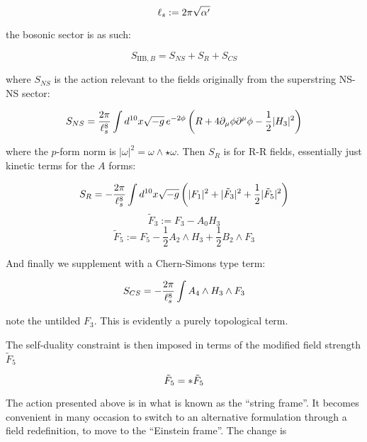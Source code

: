 \begin{equation}
	\ell_s := 2\pi \sqrt{\alpha'}
	\label{}
\end{equation}

the bosonic sector is as such:

\begin{equation} S_{\text{IIB},B} = S_{NS} + S_R + S_{CS} \label{iibsugraS}\end{equation}

where $S_{NS}$ is the action relevant to the fields originally from the superstring NS-NS sector:

\begin{equation}
S_{NS} = \frac{2\pi}{\ell_s^8} \int d^{10} x \sqrt{-g} \, e^{-2\phi} \left( R + 4 \partial_\mu \phi \partial^\mu \phi - \frac{1}{2} | H_3 |^2 \right) 
\end{equation}

where the $p$-form norm is $|\omega|^2 = \omega \wedge \star \omega$. Then $S_R$ is for R-R fields, essentially just kinetic terms for the $A$ forms:

\begin{equation}
	S_R = -\frac{2\pi}{\ell_s^8} \int d^{10} x \sqrt{-g} 
\left(| F_1 |^2 + | \tilde{F}_3 |^2 + \frac{1}{2}| \tilde{F}_5 |^2 \right)
\end{equation}
\begin{equation}
	\tilde{F}_3 := F_3 - A_0 H_3
\end{equation}
\begin{equation}
	\tilde{F}_5 := F_5 - \frac{1}{2} A_2 \wedge H_3 + \frac{1}{2} B_2 \wedge F_3
\end{equation}

And finally we supplement with a Chern-Simons type term:

\begin{equation}
S_{CS} = -\frac{2\pi}{\ell_s^8} \int A_4 \wedge H_3 \wedge F_3 
\end{equation}

note the untilded $F_3$. This is evidently a purely topological term.

The self-duality constraint is then imposed in terms of the modified field strength $\tilde F_5$

\begin{equation}
	\tilde F_5 = \ast \tilde F_5
	\label{}
\end{equation}

The action presented above is in what is known as the ``string frame''. It becomes convenient in many occasion to switch to an alternative formulation through a field redefinition, to move to the ``Einstein frame''. The change is

